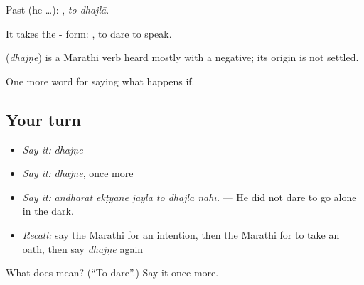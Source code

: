 Past (he …):  , \emph{to dhajlā}.

It takes the - form:  , to dare to speak.

\begin{cousinweb}
\textbf{} (\emph{dhajṇe}) is a Marathi verb heard mostly with a negative; its origin is not settled.
\end{cousinweb}

\begin{grammarlens}[title={What you've built}]
One more word for saying what happens if.
\end{grammarlens}

\subsection*{Your turn}
\begin{itemize}
\raggedright
  \item \emph{Say it:} \emph{dhajṇe}
  \item \emph{Say it:} \emph{dhajṇe}, once more
  \item \emph{Say it:} \emph{andhārāt ekṭyāne jāylā to dhajlā nāhī.} — He did not dare to go alone in the dark.
  \item \emph{Recall:} say the Marathi for an intention, then the Marathi for to take an oath, then say \emph{dhajṇe} again
\end{itemize}

\begin{tcolorbox}[breakable,colback=teal!4,colframe=teal!35!black,title={Before you move on}]
What does  mean? (\textquotedblleft{}To dare\textquotedblright{}.) Say it once more.
\end{tcolorbox}

